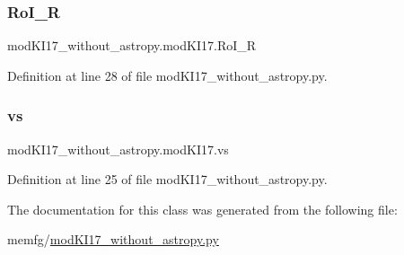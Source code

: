 \subsubsection{\texorpdfstring{Ro\+I\+\_\+R}{RoI\_R}}
{\footnotesize\ttfamily mod\+K\+I17\+\_\+without\+\_\+astropy.\+mod\+K\+I17.\+Ro\+I\+\_\+R}



Definition at line 28 of file mod\+K\+I17\+\_\+without\+\_\+astropy.\+py.

\mbox{\label{classmodKI17__without__astropy_1_1modKI17_a8a56150fe457d8eb85ff2f79d3b484cc}} 
\subsubsection{\texorpdfstring{vs}{vs}}
{\footnotesize\ttfamily mod\+K\+I17\+\_\+without\+\_\+astropy.\+mod\+K\+I17.\+vs}



Definition at line 25 of file mod\+K\+I17\+\_\+without\+\_\+astropy.\+py.



The documentation for this class was generated from the following file\+:\begin{DoxyCompactItemize}
\item 
memfg/\hyperlink{modKI17__without__astropy_8py}{mod\+K\+I17\+\_\+without\+\_\+astropy.\+py}\end{DoxyCompactItemize}

